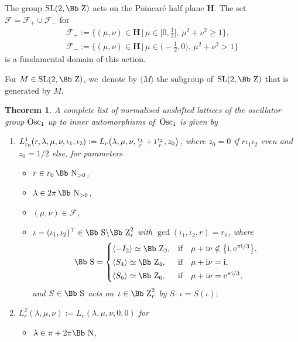 \documentclass[10pt,a4paper]{amsart}
\newcommand\NN{{\mbox{\Bb N}}}
\newcommand\ZZ{{\mbox{\Bb Z}}}
\newcommand\SSS{{\mbox{\Bb S}}}
\newcommand\cF{{\mathcal F}}
\newcommand{\SL}{\mathop{{\rm SL}}}
\newcommand{\Osc}{{\rm Osc}}
\newcommand\la{\langle}
\newcommand\ra{\rangle}
\numberwithin{equation}{section}
\newtheorem{Theorem}{Theorem}[section]
\begin{document}
The group $\SL(2,\ZZ)$ acts on the Poincar\'e half plane $\textbf{H}$. The set $\cF=\cF_+\cup\cF_-$ for
 \begin{gather}
\cF_+:= \bigg\{(\mu,\nu)\in\textbf{H}\,\bigg|\,\mu\in\bigg[0,\frac{1}{2}\bigg],\,
\mu^2+\nu^2\geq 1\bigg\},\nonumber
\\
\cF_-:= \bigg\{(\mu,\nu)\in\textbf{H}\,\bigg|\,\mu\in\bigg({-}\frac{1}{2},0\bigg),\,
\mu^2+\nu^2>1\bigg\} \label{F+}
\end{gather}
is a fundamental domain of this action.

For $M\in\SL(2,\ZZ)$, we~denote by $\la M \ra$ the subgroup of~$\SL(2,\ZZ)$ that is generated by $M$.

\begin{Theorem}\label{th:classUptoInner}
A complete list of normalised unshifted lattices of the oscillator group $\Osc_1$ up to inner automorphisms of~$\Osc_1$ is given by
\begin{enumerate}\itemsep=0pt
\item[$1.$] $L^1_{r_0}(r,\lambda,\mu,\nu,\iota_1,\iota_2):= L_r\big(\lambda,\mu,\nu,\frac{\iota_1}{r}+{\rm i}\frac{\iota_2}{r},z_0\big)$, where $z_0=0$ if $r\iota_1\iota_2$ even and $z_0=1/2$ else, for parameters
\begin{itemize}
\item[$\circ$] $r\in r_0\,\NN_{>0}$,
\item[$\circ$] $\lambda\in 2\pi\,\NN_{>0}$,
\item[$\circ$] $(\mu,\nu)\in\cF$,
\item[$\circ$] $\iota=(\iota_1,\iota_2)^\top\in\SSS\backslash\ZZ^2_r$ with $\gcd(\iota_1,\iota_2,r)=r_0$, where
\begin{gather*}
\SSS=\begin{cases}
\langle-I_2\rangle\simeq \ZZ_2, & \text{if}\quad \mu+{\rm i}\nu\notin\big\{{\rm i},{\rm e}^{\pi {\rm i}/3}\big\},
\\[0.5ex]
\langle S_4\rangle\simeq \ZZ_4, & \text{if}\quad \mu+{\rm i}\nu={\rm i},
\\[0.5ex]
\langle S_6\rangle\simeq \ZZ_6, & \text{if}\quad \mu+{\rm i}\nu={\rm e}^{\pi {\rm i}/3},
\end{cases}
\end{gather*}
and $S\in\SSS$ acts on~$\iota\in\ZZ^2_r$
by
$S\cdot\iota=S(\iota);$
\end{itemize}
%
\item[$2.$] $L^2_r(\lambda,\mu,\nu):=L_r(\lambda,\mu,\nu,0,0)$ for
\begin{itemize}
\item[$\circ$] $\lambda\in\pi+2\pi\NN$,

\end{itemize}
\end{enumerate}
\end{Theorem}
\end{document}

